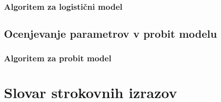 \documentclass[12pt,a4paper]{amsart}
\theoremstyle{definition} %
\theoremstyle{plain} %
\newcommand{\geslo}[2]{\noindent\textbf{#1}\hspace*{3mm}\hangindent=\parindent\hangafter=1 #2}
\begin{document}
\subsubsection{Algoritem za logistični model}

\subsection{Ocenjevanje parametrov v probit modelu}

\subsubsection{Algoritem za probit model}



\section*{Slovar strokovnih izrazov}
%
%
\nocite{*}


\end{document}
